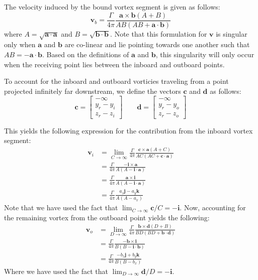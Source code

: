 \documentclass[12pt]{article}
\newcommand{\f}{\frac}
\newcommand{\mb}{\mathbf}
\begin{document}
The velocity induced by the bound vortex segment is given as follows:
%
\begin{equation*}
  \mb{v}_{b} = \f{\Gamma}{4\pi} \f{\mb{a} \times \mb{b} (A + B)}{AB(AB + \mb{a}\cdot \mb{b})}
\end{equation*}
where $A = \sqrt{\mb{a}\cdot \mb{a}}$ and $B =
\sqrt{\mb{b}\cdot\mb{b}}$.  Note that this formulation for $\mb{v}$ is
singular only when $\mb{a}$ and $\mb{b}$ are co-linear and lie
pointing towards one another such that $AB = - \mb{a}\cdot \mb{b}$.
Based on the definitions of $\mb{a}$ and $\mb{b}$, this singularity
will only occur when the receiving point lies between the inboard and
outboard points.

To account for the inboard and outboard vorticies traveling from a
point projected infinitely far downstream, we define the vectors
$\mb{c}$ and $\mb{d}$ as follows:
%
\begin{equation*}
  \mb{c} = \begin{bmatrix}
    -\infty \\
    y_{r} - y_{i} \\ 
    z_{r} - z_{i}
  \end{bmatrix}
  \qquad
  \mb{d} = \begin{bmatrix}
    -\infty \\
    y_{r} - y_{o} \\ 
    z_{r} - z_{o}
  \end{bmatrix}
\end{equation*}

This yields the following expression for the contribution from the
inboard vortex segment:
%
\begin{equation*}
  \begin{aligned}
    \mb{v}_{i} & = \lim_{C \rightarrow \infty} \f{\Gamma}{4\pi} \f{\mb{c} \times \mb{a}(A + C)}{AC(AC + \mb{c}\cdot \mb{a})} \\
    & = \f{\Gamma}{4\pi} \f{-\mb{i} \times \mb{a}}{A(A - \mb{i}\cdot \mb{a})} \\
    & = \f{\Gamma}{4\pi} \f{\mb{a} \times \mb{i}}{A(A - \mb{i}\cdot \mb{a})} \\
    & = \f{\Gamma}{4\pi} \f{a_{z} \mb{j} - a_{y}\mb{k}}{A(A - a_x)}
  \end{aligned}
\end{equation*}
Note that we have used the fact that $\lim_{C \rightarrow \infty}
\mb{c}/C = -\mb{i}$.  Now, accounting for the remaining vortex from
the outboard point yields the following:
\begin{equation*}
  \begin{aligned}
    \mb{v}_{o} & = \lim_{D \rightarrow \infty}\f{\Gamma}{4\pi} \f{ \mb{b} \times \mb{d}(D + B)}{BD(BD + \mb{b}\cdot \mb{d})} \\
    & = \f{\Gamma}{4\pi} \f{-\mb{b} \times \mb{i}}{B(B - \mb{i}\cdot \mb{b})} \\
    & = \f{\Gamma}{4\pi} \f{-b_{z} \mb{j} + b_{y} \mb{k}}{B(B - b_x)}
  \end{aligned}
\end{equation*}
Where we have used the fact that $\lim_{D \rightarrow \infty} \mb{d}/D
= -\mb{i}$.
\end{document}
